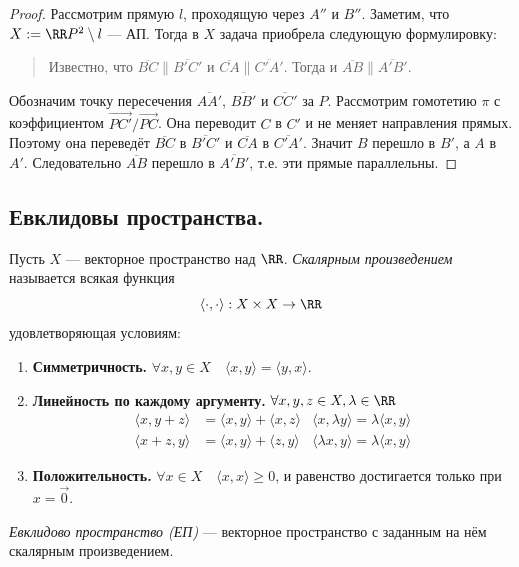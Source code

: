 \documentclass[12pt,a4paper]{article}
\begin{document}
    \begin{proof}
        Рассмотрим прямую $l$, проходящую через $A''$ и $B''$. Заметим, что $X := \RR P^2 \setminus l$ --- АП. Тогда в $X$ задача приобрела следующую формулировку:
        \begin{quotation}
            Известно, что $\overline{BC} \parallel \overline{B'C'}$ и $\overline{CA} \parallel \overline{C'A'}$. Тогда и $\overline{AB} \parallel \overline{A'B'}$.
        \end{quotation}

        Обозначим точку пересечения $\overline{AA'}$, $\overline{BB'}$ и $\overline{CC'}$ за $P$. Рассмотрим гомотетию $\pi$ с коэффициентом $\overrightarrow{PC'} / \overrightarrow{PC}$. Она переводит $C$ в $C'$ и не меняет направления прямых. Поэтому она переведёт $\overline{BC}$ в $\overline{B'C'}$ и $\overline{CA}$ в $\overline{C'A'}$. Значит $B$ перешло в $B'$, а $A$ в $A'$. Следовательно $\overline{AB}$ перешло в $\overline{A'B'}$, т.е. эти прямые параллельны.
    \end{proof}

    \subsection{Евклидовы пространства.}

    \begin{definition}
        Пусть $X$ --- векторное пространство над $\RR$. \emph{Скалярным произведением} называется всякая функция
        \[\langle \cdot, \cdot \rangle: X \times X \to \RR\]
        удовлетворяющая условиям:
        \begin{enumerate}
            \item \textbf{Симметричность.} $\forall x, y \in X \quad \langle x, y \rangle = \langle y, x \rangle$.
            \item \textbf{Линейность по каждому аргументу.} $\forall x, y, z \in X, \lambda \in \RR$
            \begin{align*}
                \langle x, y + z \rangle &= \langle x, y \rangle + \langle x, z \rangle&
                \langle x, \lambda y \rangle = \lambda \langle x, y \rangle\\
                \langle x + z, y \rangle &= \langle x, y \rangle + \langle z, y \rangle&
                \langle \lambda x, y \rangle = \lambda \langle x, y \rangle
            \end{align*}
            \item \textbf{Положительность.} $\forall x \in X \quad \langle x, x \rangle \geqslant 0$, и равенство достигается только при $x = \vec{0}$.
        \end{enumerate}

        \emph{Евклидово пространство (ЕП)} --- векторное пространство с заданным на нём скалярным произведением.
    \end{definition}
\end{document}
